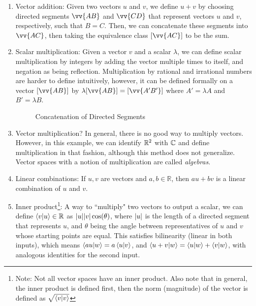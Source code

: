 \begin{enumerate}
    \item Vector addition: Given two vectors $u$ and $v$, we define $u + v$ by choosing directed segments $\vv{AB}$ and $\vv{CD}$ that represent vectors $u$ and $v$, respectively, such that $B = C$. Then, we can concatenate these segments into $\vv{AC}$, then taking the equivalence class $[\vv{AC}]$ to be the sum.
    
    \item Scalar multiplication: Given a vector $v$ and a scalar $\lambda$, we can define scalar multiplication by integers by adding the vector multiple times to itself, and negation as being reflection. Multiplication by rational and irrational numbers are harder to define intuitively, however, it can be defined formally on a vector $[\vv{AB}]$ by $\lambda[\vv{AB}] = [\vv{A'B'}]$ where $A' = \lambda A$ and $B' = \lambda B$.
    
    \begin{figure}[h!]
        \centering
        \caption{Concatenation of Directed Segments}
    \end{figure}

    \item Vector multiplication? In general, there is no good way to multiply vectors. However, in this example, we can identify $\mathbb R^2$ with $\mathbb C$ and define multiplication in that fashion, although this method does not generalize. Vector spaces with a notion of multiplication are called \textit{algebras}.
    
    \item Linear combinations: If $u, v$ are vectors and $a, b \in \mathbb R$, then $au + bv$ is a linear combination of $u$ and $v$.
    
    \item Inner product\footnote{Note: Not all vector spaces have an inner product. Also note that in general, the inner product is defined first, then the norm (magnitude) of the vector is defined as $\sqrt{\braket{v}{v}}$}: A way to ``multiply" two vectors to output a scalar, we can define $\bra{v}\ket{u} \in \mathbb R$ as $\abs{u}\abs{v}\cos(\theta)$, where $\abs{u}$ is the length of a directed segment that represents $u$, and $\theta$ being the angle between representatives of $u$ and $v$ whose starting points are equal. This satisfies bilinearity (linear in both inputs), which means $\braket{au}{w} = a\braket{u}{v}$, and $\braket{u + v}{w} = \braket{u}{w} + \braket{v}{w}$, with analogous identities for the second input.
    

\end{enumerate}
